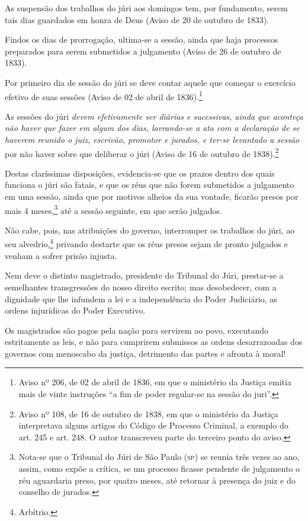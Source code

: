 As suspensão dos trabalhos do júri aos domingos tem, por fundamento,
serem tais dias guardados em honra de Deus (Aviso de 20 de outubro de
1833).

Findos os dias de prorrogação, ultima-se a sessão, ainda que haja
processos preparados para serem submetidos a julgamento (Aviso de 26 de
outubro de 1833).

Por primeiro dia de sessão do júri se deve contar aquele que começar o
exercício efetivo de suas sessões (Aviso de 02 de abril de
1836).\footnote{Aviso nº 206, de 02 de abril de 1836, em que o ministério da
  Justiça emitia mais de vinte instruções ``a fim de poder regular-se na
  sessão do juri''.}

As sessões do júri \emph{devem efetivamente ser diárias e sucessivas,
ainda que aconteça não haver que fazer em algum dos dias, lavrando-se a
ata com a declaração de se haverem reunido o juiz, escrivão, promotor e
jurados, e ter-se levantado a sessão} por não haver sobre que deliberar
o júri (Aviso de 16 de outubro de 1838).\footnote{Aviso nº 108, de
  16 de outubro de 1838, em que o ministério da Justiça interpretava alguns artigos
  do Código de Processo Criminal, a exemplo do art. 245 e art. 248. O
  autor transcreveu parte do terceiro ponto do aviso.}

Destas claríssimas disposições, evidencia-se que os prazos dentro dos
quais funciona o júri são fatais, e que os réus que não forem submetidos
a julgamento em uma sessão, ainda que por motivos alheios da sua
vontade, ficarão presos por mais 4 meses,\footnote{Nota-se que o
  Tribunal do Júri de São Paulo (\textsc{sp}) se reunia três vezes ao ano, assim,
  como expõe a crítica, se um processo ficasse pendente de julgamento o
  réu aguardaria preso, por quatro meses, até retornar à presença do
  juiz e do conselho de jurados.} até a sessão seguinte, em que serão
julgados.

Não cabe, pois, nas atribuições do governo, interromper os trabalhos do
júri, ao seu alvedrio,\footnote{Arbítrio.} privando destarte que os
réus presos sejam de pronto julgados e venham a sofrer prisão injusta.

Nem deve o distinto magistrado, presidente do Tribunal do Júri,
prestar-se a semelhantes transgressões do nosso direito escrito; mas
desobedecer, com a dignidade que lhe infundem a lei e a independência do
Poder Judiciário, as ordens injurídicas do Poder Executivo.

Os magistrados são pagos pela nação para servirem ao povo, executando
estritamente as leis, e não para cumprirem submissos as ordens
desarrazoadas dos governos com menoscabo da justiça, detrimento das
partes e afronta à moral!

